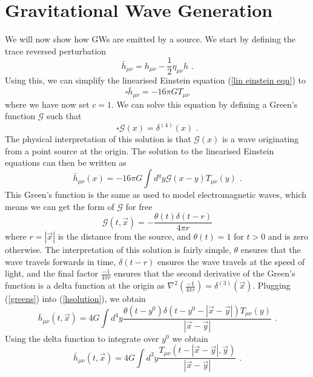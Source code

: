 \documentclass[11pt]{cuthesis}
\newcommand{\mn}{_{\mu\nu}}
\newcommand{\fs}{\text{ .}}
\begin{document}
\section{Gravitational Wave Generation} 
We will now show how GWs are emitted by a source. We start by defining the trace reversed perturbation
\begin{equation}
\bar{h}\mn = h\mn - \frac{1}{2} \eta\mn h \fs
\end{equation}
Using this, we can simplify the linearised Einstein equation (\ref{lin einstein eqn}) to 
\begin{equation}
\square \bar{h}\mn = -16\pi G T\mn
\end{equation}
where we have now set $c=1$. We can solve this equation by defining a Green's function $\mathcal{G}$ such that
\begin{equation}
\square \mathcal{G}(x)=\delta^{(4)}(x) \fs
\end{equation}
The physical interpretation of this solution is that $ \mathcal{G}(x)$ is a wave originating from a point source at the origin. The solution to the linearised Einstein equations can then be written as
\begin{equation} \label{hsolution}
\bar{h}\mn (x) = -16\pi G \int d^y y \mathcal{G}(x-y)T\mn (y) \fs
\end{equation}
This Green's function is the same as used to model electromagnetic waves, which means we can get the form of $\mathcal{G}$ for free
\begin{equation} \label{greens}
\mathcal{G}(t,\vec{x}) = -\frac{\theta(t) \delta(t-r)}{4\pi r}
\end{equation}
where $r=|\vec{x}|$ is the distance from the source, and $\theta(t)=1$ for $t>0$ and is zero otherwise. The interpretation of this solution is fairly simple, $\theta$ ensures that the wave travels forwards in time, $\delta(t-r)$ ensures the wave travels at the speed of light, and the final factor $\frac{-1}{4\pi r}$ ensures that the second derivative of the Green's function is a delta function at the origin as $\nabla^2\left(\frac{-1}{4\pi r}\right) = \delta^{(3)}(\vec{x})$. Plugging (\ref{greens}) into (\ref{hsolution}), we obtain
\begin{equation}
\bar{h}\mn (t,\vec{x}) = 4G \int d^4 y \frac{\theta(t-y^0) \delta(t-y^0 - |\vec{x} - \vec{y}| ) T\mn (y) }{|\vec{x} - \vec{y}|} \fs
\end{equation}
Using the delta function to integrate over $y^0$ we obtain
\begin{equation}
\bar{h}\mn (t,\vec{x}) = 4G \int d^3 y \frac{T\mn (t-|\vec{x} - \vec{y}|,\vec{y})}{|\vec{x} - \vec{y}|} \fs
\end{equation} 
\end{document}
